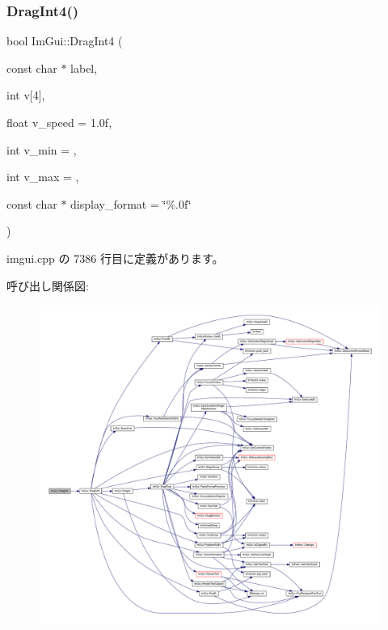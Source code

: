 \subsubsection{\texorpdfstring{Drag\+Int4()}{DragInt4()}}
{\footnotesize\ttfamily bool Im\+Gui\+::\+Drag\+Int4 (\begin{DoxyParamCaption}\item[{const char $\ast$}]{label,  }\item[{int}]{v\mbox{[}4\mbox{]},  }\item[{float}]{v\+\_\+speed = {\ttfamily 1.0f},  }\item[{int}]{v\+\_\+min = {},  }\item[{int}]{v\+\_\+max = {},  }\item[{const char $\ast$}]{display\+\_\+format = {\ttfamily \char`\"{}\%.0f\char`\"{}} }\end{DoxyParamCaption})}



 imgui.\+cpp の 7386 行目に定義があります。

呼び出し関係図\+:\nopagebreak
\begin{figure}[H]
\begin{center}
\leavevmode
\includegraphics[width=350pt]{namespace_im_gui_a65b6e42ba7a4aa73fd3e1dc74f93d180_cgraph}
\end{center}
\end{figure}
\mbox{\label{namespace_im_gui_a2854d672b818938e6e9fb1de6de3dbe7}} 
